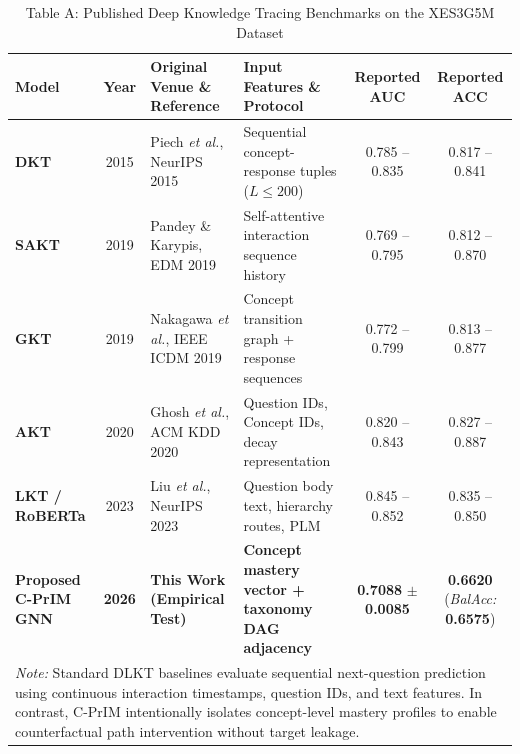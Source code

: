 
\begin{table}[t]
\centering
\caption{Table A: Published Deep Knowledge Tracing Benchmarks on the XES3G5M Dataset}
\label{tab:literature_benchmarks}
\small
\begin{tabular}{lcp{4.8cm}p{4.2cm}cc}
\hline
\textbf{Model} & \textbf{Year} & \textbf{Original Venue \& Reference} & \textbf{Input Features \& Protocol} & \textbf{Reported AUC} & \textbf{Reported ACC} \\
\hline
\textbf{DKT} & 2015 & Piech \textit{et al.}, NeurIPS 2015 \cite{piech2015deep} & Sequential concept-response tuples ($L \le 200$) & 0.785 -- 0.835 & 0.817 -- 0.841 \\
\textbf{SAKT} & 2019 & Pandey \& Karypis, EDM 2019 \cite{pandey2019self} & Self-attentive interaction sequence history & 0.769 -- 0.795 & 0.812 -- 0.870 \\
\textbf{GKT} & 2019 & Nakagawa \textit{et al.}, IEEE ICDM 2019 \cite{nakagawa2019graph} & Concept transition graph + response sequences & 0.772 -- 0.799 & 0.813 -- 0.877 \\
\textbf{AKT} & 2020 & Ghosh \textit{et al.}, ACM KDD 2020 \cite{ghosh2020context} & Question IDs, Concept IDs, decay representation & 0.820 -- 0.843 & 0.827 -- 0.887 \\
\textbf{LKT / RoBERTa} & 2023 & Liu \textit{et al.}, NeurIPS 2023 \cite{liu2023xes3g5m} & Question body text, hierarchy routes, PLM & 0.845 -- 0.852 & 0.835 -- 0.850 \\
\hline
\textbf{Proposed C-PrIM GNN} & \textbf{2026} & \textbf{This Work (Empirical Test)} & \textbf{Concept mastery vector + taxonomy DAG adjacency} & \textbf{0.7088} $\pm$ \textbf{0.0085} & \textbf{0.6620} (\textit{BalAcc:} \textbf{0.6575}) \\
\hline
\multicolumn{6}{p{16.5cm}}{\textit{Note:} Standard DLKT baselines evaluate sequential next-question prediction using continuous interaction timestamps, question IDs, and text features. In contrast, C-PrIM intentionally isolates concept-level mastery profiles to enable counterfactual path intervention without target leakage.}
\end{tabular}
\end{table}

